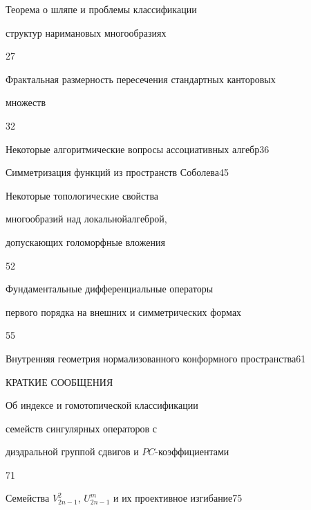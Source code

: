 {Теорема о шляпе и проблемы классификации 


структур на\newline римановых многообразиях}{27}




{Фрактальная размерность пересечения стандартных канторовых \newline


множеств}{32}




{Некоторые алгоритмические вопросы ассоциативных алгебр}{36}




{Симметризация функций из пространств Соболева}{45}




{Некоторые топологические свойства 


многообразий над локальной\newline алгеброй, 


допускающих голоморфные вложения}{52}




{Фундаментальные дифференциальные операторы\newline


первого порядка на внешних и симметрических формах}{55}




{Внутренняя геометрия нормализованного конформного пространства}{61}





\bigskip


\par





\centerline{КРАТКИЕ СООБЩЕНИЯ}


\bigskip







{Об индексе и гомотопической классификации \newline


семейств сингулярных операторов с


диэдральной группой сдвигов и $PC$-коэффициентами}{71}




{Семейства $V^2_{2n-1}$, $U^m_{2n-1}$ и их проективное изгибание}{75}


